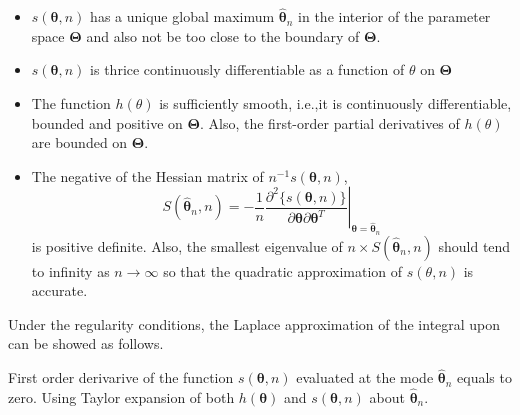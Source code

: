 \documentclass[
]{book}
\providecommand{\tightlist}{%
  \setlength{\itemsep}{0pt}\setlength{\parskip}{0pt}}
\theoremstyle{definition}
\theoremstyle{definition}
\theoremstyle{definition}
\theoremstyle{remark}
\begin{document}
\begin{itemize}
\tightlist
\item
  \(s(\boldsymbol{\theta}, n)\) has a unique global maximum \(\hat{\boldsymbol \theta}_n\) in the interior of the parameter space \(\mathbf \Theta\) and also not be too close to the boundary of \(\mathbf \Theta\).
\item
  \(s(\boldsymbol{\theta}, n)\) is thrice continuously differentiable as a function of \(\theta\) on \(\mathbf \Theta\)
\item
  The function \(h(\theta)\) is sufficiently smooth, i.e.,it is continuously differentiable, bounded and positive on \(\mathbf \Theta\). Also, the first-order partial derivatives of \(h(\theta)\) are bounded on \(\mathbf \Theta\).
\item
  The negative of the Hessian matrix of \(n^{-1} s(\boldsymbol{\theta}, n)\),
  \[
  S\left(\hat{\boldsymbol{\theta}}_{n}, n\right)=-\left.\frac{1}{n} \frac{\partial^{2}\{s(\boldsymbol{\theta}, n)\}}{\partial \boldsymbol{\theta} \partial \boldsymbol{\theta}^{T}}\right|_{\boldsymbol{\theta}=\hat{\boldsymbol{\theta}}_{n}}
  \]
  is positive definite. Also, the smallest eigenvalue of \(n \times S\left(\hat{\boldsymbol{\theta}}_{n}, n\right)\) should tend to infinity as \(n\rightarrow \infty\) so that the quadratic approximation of \(s(\theta,n)\) is accurate.
\end{itemize}

Under the regularity conditions, the Laplace approximation of the integral upon can be showed as follows.

First order derivarive of the function \(s(\boldsymbol{\theta}, n)\) evaluated at the mode \(\hat{\boldsymbol{\theta}}_{n}\) equals to zero.
Using Taylor expansion of both \(h(\boldsymbol \theta)\) and \(s(\boldsymbol{\theta}, n)\) about \(\hat{\boldsymbol \theta}_n\).
\end{document}
